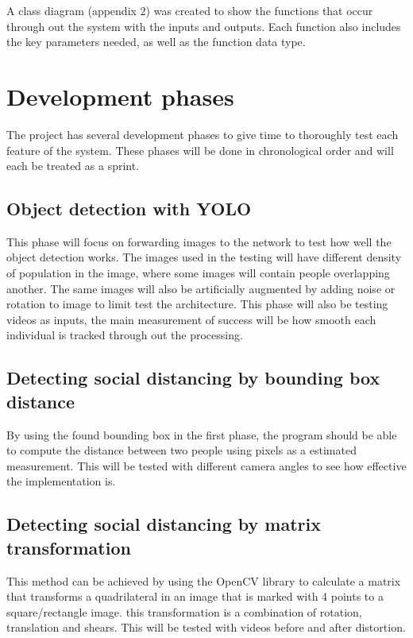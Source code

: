 \documentclass[12pt]{report}
\begin{document}
A class diagram (appendix 2) was created to show the functions that occur through out the system with the inputs and outputs. Each function also includes the key parameters needed, as well as the function data type.

\section{Development phases}

The project has several development phases to give time to thoroughly test each feature of the system. These phases will be done in chronological order and will each be treated as a sprint.

\subsection*{Object detection with YOLO}

This phase will focus on forwarding images to the network to test how well the object detection works. The images used in the testing will have different density of population in the image, where some images will contain people overlapping another. The same images will also be artificially augmented by adding noise or rotation to image to limit test the architecture. This phase will also be testing videos as inputs, the main measurement of success will be how smooth each individual is tracked through out the processing.

\subsection*{Detecting social distancing by bounding box distance}

By using the found bounding box in the first phase, the program should be able to compute the distance between two people using pixels as a estimated measurement. This will be tested with different camera angles to see how effective the implementation is.

\subsection*{Detecting social distancing by matrix transformation}

This method can be achieved by using the OpenCV library to calculate a matrix that transforms a quadrilateral in an image that is marked with 4 points to a square/rectangle image. this transformation is a combination of rotation, translation and shears. This will be tested with videos before and after distortion.
\end{document}
